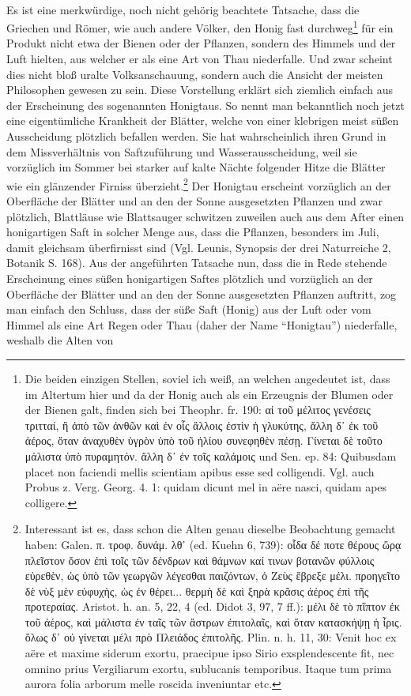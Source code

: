 \documentclass[a4paper, 11pt, oneside]{article}
\begin{document}
\paragraph{}
Es ist eine merkwürdige, noch nicht gehörig beachtete Tatsache, dass die Griechen und Römer, wie auch andere Völker, den Honig fast durchweg\footnote{Die beiden einzigen Stellen, soviel ich weiß, an welchen angedeutet ist, dass im Altertum hier und da der Honig auch als ein Erzeugnis der Blumen oder der Bienen galt, finden sich bei Theophr. fr. 190: αἱ τοῦ μέλιτος γενέσεις τριτταί, ἢ ἀπὸ τῶν ἀνθῶν καὶ ἐν οἷς ἄλλοις ἐστὶν ἡ γλυκύτης, ἄλλη δ᾽ ἐκ τοῦ ἀέρος, ὅταν ἀναχυθὲν ὑγρὸν ὑπὸ τοῦ ἡλίου συνεφηθὲν πέσῃ. Γίνεται δὲ τοῦτο μάλιστα ὑπὸ πυραμητόν. ἄλλη δ᾽ ἐν τοῖς καλάμοις und Sen. ep. 84: Quibusdam placet non faciendi mellis scientiam apibus esse sed colligendi. Vgl. auch Probus z. Verg. Georg. 4. 1: quidam dicunt mel in aëre nasci, quidam apes colligere.} für ein Produkt nicht etwa der Bienen oder der Pflanzen, sondern des Himmels und der Luft hielten, aus welcher er als eine Art von Thau niederfalle. Und zwar scheint dies nicht bloß uralte Volksanschauung, sondern auch die Ansicht der meisten Philosophen gewesen zu sein. Diese Vorstellung erklärt sich ziemlich einfach aus der Erscheinung des sogenannten Honigtaus. So nennt man bekanntlich noch jetzt eine eigentümliche Krankheit der Blätter, welche von einer klebrigen meist süßen Ausscheidung plötzlich befallen werden. Sie hat wahrscheinlich ihren Grund in dem Missverhältnis von Saftzuführung und Wasserausscheidung, weil sie vorzüglich im Sommer bei starker auf kalte Nächte folgender Hitze die Blätter wie ein glänzender Firniss überzieht.\footnote{Interessant ist es, dass schon die Alten genau dieselbe Beobachtung gemacht haben: Galen. π. τροφ. δυνάμ. λθ᾽ (ed. Kuehn 6, 739): οἷδα δέ ποτε θέρους ὥρᾳ πλεῖστον ὅσον ἐπὶ τοῖς τῶν δένδρων καὶ θάμνων καί τινων βοτανῶν φύλλοις εὐρεθὲν, ὡς ὑπὸ τῶν γεωργῶν λέγεσθαι παιζόντων, ὀ Ζεὺς ἔβρεξε μέλι. προηγεῖτο δὲ νὺξ μὲν εὐφυχὴς, ὡς ἐν θέρει... θερμὴ δὲ καὶ ξηρὰ κρᾶσις ἀέρος ἐπὶ τῆς προτεραίας. Aristot. h. an. 5, 22, 4 (ed. Didot 3, 97, 7 ff.): μέλι δὲ τὸ πῖπτον ἐκ τοῦ ἀέρος, καὶ μάλιστα ἐν ταῖς τῶν ἄστρων ἐπιτολαῖς, καὶ ὅταν κατασκήψῃ ἡ ἶρις. ὅλως δ᾽ οὐ γίνεται μέλι πρὸ Πλειάδος ἐπιτολῆς. Plin. n. h. 11, 30: Venit hoc ex aëre et maxime siderum exortu, praecipue ipso Sirio exsplendescente fit, nec omnino prius Vergiliarum exortu, sublucanis temporibus. Itaque tum prima aurora folia arborum melle roscida inveniuntar etc.} Der Honigtau erscheint vorzüglich an der Oberfläche der Blätter und an den der Sonne ausgesetzten Pflanzen und zwar plötzlich, Blattläuse wie Blattsauger schwitzen zuweilen auch aus dem After einen honigartigen Saft in solcher Menge aus, dass die Pflanzen, besonders im Juli, damit gleichsam überfirnisst sind (Vgl. Leunis, Synopsis der drei Naturreiche 2, Botanik S. 168). Aus der angeführten Tatsache nun, dass die in Rede stehende Erscheinung eines süßen honigartigen Saftes plötzlich und vorzüglich an der Oberfläche der Blätter und an den der Sonne ausgesetzten Pflanzen auftritt, zog man einfach den Schluss, dass der süße Saft (Honig) aus der Luft oder vom Himmel als eine Art Regen oder Thau (daher der Name "`Honigtau"') niederfalle, weshalb die Alten von 
\end{document}
